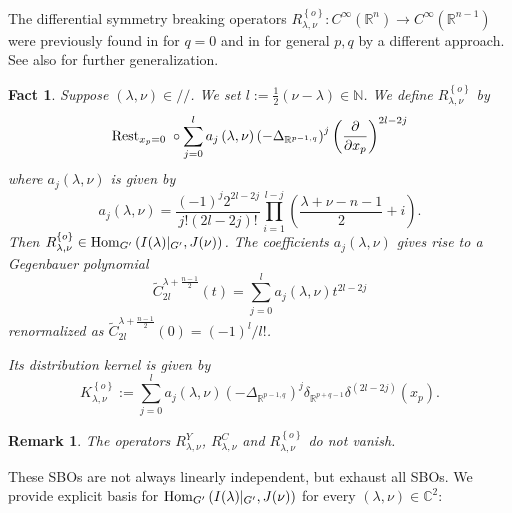 \documentclass[reqno,12pt]{pja00} %
\newcommand{\R}{\mathbb{R}}
\newcommand{\N}{\mathbb{N}}
\let\oldsum\sum
\renewcommand{\sum}{\displaystyle\oldsum}
\theoremstyle{plain}
\newtheorem{remark}[theorem]{Remark}
\newtheorem{fact}[theorem]{Fact}
\theoremstyle{definition}
\theoremstyle{exampstyle} \newtheorem{examp}[theorem]{Theorem}
\newcommand{\IlambdaGprime}{I(\lambda)\kern-0.3em\mid_{G'}}
\newcommand{\Hom}{\operatorname{Hom}}
\newcommand{\SBO}{\Hom_{G'}\left(\IlambdaGprime,J(\nu) \right)}
\begin{document}
The differential symmetry breaking operators
 $R_{\lambda,\nu}^{\left\{ o \right\}}\colon
C^\infty\left( \R^n \right)\to C^\infty\left( \R^{n-1} \right)$
	were previously found in \cite[Thms.\ 5.1.1 and 5.2.1]{juhl2009families} for $q=0$ 
and in \cite[Thm.\ 4.3]{kobayashi2015branching}
	for general $p,q$ by a different approach. 
See also \cite{kokupeLNM, kokupe2016forms} for further generalization.
\begin{fact}\label{fact:singo}
	Suppose $(\lambda,\nu)\in//$. We set $l:=\frac{1}{2}\left( \nu-\lambda \right)\in\N$.
	We define $R_{\lambda,\nu}^{ \left\{ o \right\}}$ by
	\begin{equation*}
		\mbox{\normalfont Rest}_{x_p=0}\;\circ
	\sum_{j=0}^la_j\left( \lambda,\nu \right)\left(- \Delta_{\mathbb{R}^{p-1,q}} \right)^j\left( \frac{\partial}{\partial x_p} \right)^{2l-2j}
	\end{equation*}
	where $a_j(\lambda,\nu)$ is given by\begin{equation*}
		a_j(\lambda,\nu)=\frac{(-1)^j2^{2l-2j}}{j!(2l-2j)!}\prod_{i=1}^{l-j}\left(\frac{\lambda+\nu-n-1}{2} 
		+i \right).
	\end{equation*}
	Then $R_{\lambda,\nu}^{ \left\{ o \right\}}\in\Hom_{G'}\left( I(\lambda)\kern-0.1cm\mid_{G'},J(\nu) \right)$.
	The coefficients $a_j(\lambda,\nu)$ gives rise to a Gegenbauer polynomial\begin{equation*}
		\tilde{C}_{2l}^{\lambda+\frac{n-1}{2}}(t)=\sum_{j=0}^la_j(\lambda,\nu)t^{2l-2j}
	\end{equation*}
	renormalized as $\tilde{C}_{2l}^{\lambda+\frac{n-1}{2}}(0)=\left( -1 \right)^l/l!$.

	Its distribution kernel is given by
	\begin{equation*}
		K_{\lambda,\nu}^{ \left\{ o \right\} }:=\sum_{j=0}^la_j(\lambda,\nu)\left( -\Delta_{\R^{p-1,q}} \right)^j\delta_{\R^{p+q-1}}\delta^{\left( 2l-2j \right)}(x_p).
	\end{equation*}
\end{fact}
\begin{remark}\label{rmk:thm:construction}
	The operators $R_{\lambda,\nu}^Y$, $R_{\lambda,\nu}^C$ and $R^{ \left\{ o \right\}}_{\lambda,\nu}$ do not vanish.
\end{remark}
These SBOs are not always linearly independent, but exhaust all SBOs. We provide explicit
basis for $\SBO$ for every $(\lambda,\nu)\in \mathbb{C}^2$:
\end{document}

